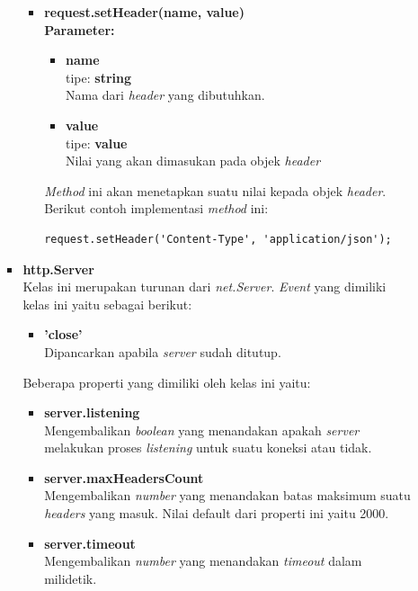 \documentclass[a4paper,twoside]{article}
\begin{document}
\begin{enumerate}
\begin{enumerate}
\begin{itemize}
\begin{itemize}
					\item \textbf{request.setHeader(name, value)} \\ 
					\textbf{Parameter:}
					\begin{itemize}
						\item \textbf{name} \\tipe: \textbf{string} \\ Nama dari \textit{header} yang dibutuhkan.
						\item \textbf{value} \\tipe: \textbf{value} \\ Nilai yang akan dimasukan pada objek \textit{header}
					\end{itemize}
					
					\textit{Method} ini akan menetapkan suatu nilai kepada objek \textit{header}. Berikut contoh implementasi \textit{method} ini:
\begin{lstlisting}
request.setHeader('Content-Type', 'application/json');
\end{lstlisting}
				\end{itemize}
				
				\item \textbf{http.Server} \\ 
				Kelas ini merupakan turunan dari \textit{net.Server}. \textit{Event} yang dimiliki kelas ini yaitu sebagai berikut:
				\begin{itemize}
					\item \textbf{'close'} \\ Dipancarkan apabila \textit{server} sudah ditutup.
					
				\end{itemize}
				
				Beberapa properti yang dimiliki oleh kelas ini yaitu:
				\begin{itemize}
					\item \textbf{server.listening} \\ Mengembalikan \textit{boolean} yang menandakan apakah \textit{server} melakukan proses \textit{listening} untuk suatu koneksi atau tidak.
					
					\item \textbf{server.maxHeadersCount} \\ Mengembalikan \textit{number} yang menandakan batas maksimum suatu \textit{headers} yang masuk. Nilai default dari properti ini yaitu 2000.
					
					\item \textbf{server.timeout} \\ Mengembalikan \textit{number} yang menandakan \textit{timeout} dalam milidetik.
				\end{itemize}
				

\end{itemize}
\end{enumerate}
\end{enumerate}
\end{document}

